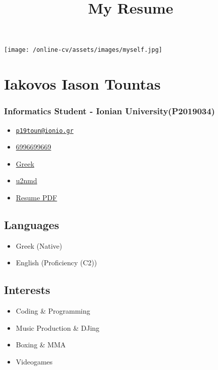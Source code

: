 \documentclass[english,]{article}
\title{My Resume}
\date{}
\providecommand{\tightlist}{%
  \setlength{\itemsep}{0pt}\setlength{\parskip}{0pt}}
\begin{document}
\maketitle

\texttt{[image: /online-cv/assets/images/myself.jpg]}

\hypertarget{iakovos-iason-tountas}{%
\section{Iakovos Iason Tountas}\label{iakovos-iason-tountas}}

\hypertarget{informatics-student---ionian-universityp2019034}{%
\subsubsection{Informatics Student - Ionian
University(P2019034)}\label{informatics-student---ionian-universityp2019034}}

\begin{itemize}
\tightlist
\item
  \emph{} \href{mailto:p19toun@ionio.gr}{\nolinkurl{p19toun@ionio.gr}}
\item
  \emph{} \href{tel:6996699669}{6996699669}
\item
  \emph{} \href{}{Greek}
\item
  \emph{} \href{http://github.com/u2nmd}{u2nmd}
\item
  \emph{} \href{http://www.africau.edu/images/default/sample.pdf}{Resume
  PDF}
\end{itemize}

\hypertarget{languages}{%
\subsection{Languages}\label{languages}}

\begin{itemize}
\tightlist
\item
  Greek {(Native)}
\item
  English {(Proficiency (C2))}
\end{itemize}

\hypertarget{interests}{%
\subsection{Interests}\label{interests}}

\begin{itemize}
\tightlist
\item
  Coding \& Programming
\item
  Music Production \& DJing
\item
  Boxing \& MMA
\item
  Videogames
\end{itemize}
\end{document}
